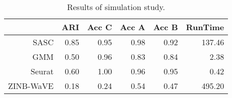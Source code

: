 \begin{table}[ht]
\centering
\begin{tabular}{rrrrrr}
  \hline
 & ARI & Acc C & Acc A & Acc B & RunTime \\ 
  \hline
SASC & 0.85 & 0.95 & 0.98 & 0.92 & 137.46 \\ 
  GMM & 0.50 & 0.96 & 0.83 & 0.84 & 2.38 \\ 
  Seurat & 0.60 & 1.00 & 0.96 & 0.95 & 0.42 \\ 
  ZINB-WaVE & 0.18 & 0.24 & 0.54 & 0.47 & 495.20 \\ 
   \hline
\end{tabular}
\caption{Results of simulation study.} 
\label{table:sim_results}
\end{table}
